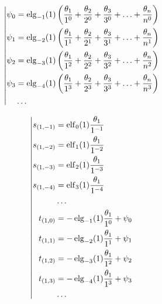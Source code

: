 \begin{equation*} \left| \begin{aligned}
\psi_0 &= \elg_{-1}(1) \left(
  \frac{\theta_1}{1^0}
+ \frac{\theta_2}{2^0}
+ \frac{\theta_3}{3^0}
+ \ldots
+ \frac{\theta_n}{n^0} \right) \\
%
\psi_1 &= \elg_{-2}(1) \left(
  \frac{\theta_1}{1^1}
+ \frac{\theta_2}{2^1}
+ \frac{\theta_3}{3^1}
+ \ldots
+ \frac{\theta_n}{n^1} \right) \\
%
\psi_2 &= \elg_{-3}(1) \left(
  \frac{\theta_1}{1^2}
+ \frac{\theta_2}{2^2}
+ \frac{\theta_3}{3^2}
+ \ldots
+ \frac{\theta_n}{n^2} \right) \\
%
\psi_3 &= \elg_{-4}(1) \left(
  \frac{\theta_1}{1^3}
+ \frac{\theta_2}{2^3}
+ \frac{\theta_3}{3^3}
+ \ldots
+ \frac{\theta_n}{n^3} \right) \\
%
&\ldots \\
\end{aligned} \right. \end{equation*}

\begin{equation*} \left| \begin{aligned}
%
s_{(1,-1)} &=
  \elf_0(1) \frac{\theta_1}{1^{-1}} \\
%
s_{(1,-2)} &=
  \elf_1(1) \frac{\theta_1}{1^{-2}} \\
%
s_{(1,-3)} &=
  \elf_2(1) \frac{\theta_1}{1^{-3}} \\
%
s_{(1,-4)} &=
  \elf_3(1) \frac{\theta_1}{1^{-4}} \\
%
&\ldots \\
%
t_{(1,0)} &=
- \elg_{-1}(1) \frac{\theta_1}{1^0}
+ \psi_0 \\
%
t_{(1,1)} &=
- \elg_{-2}(1) \frac{\theta_1}{1^1}
+ \psi_1 \\
%
t_{(1,2)} &=
- \elg_{-3}(1) \frac{\theta_1}{1^2}
+ \psi_2 \\
%
t_{(1,3)} &=
- \elg_{-4}(1) \frac{\theta_1}{1^3}
+ \psi_3 \\
%
&\ldots \\
\end{aligned} \right. \end{equation*}

